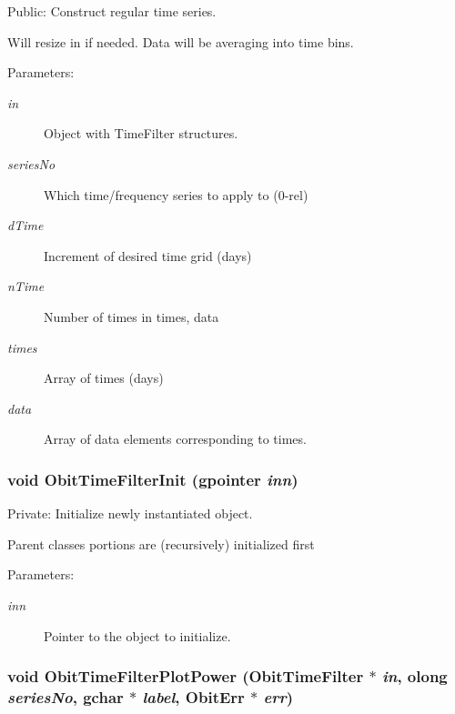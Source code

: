 Public: Construct regular time series. 

Will resize in if needed. Data will be averaging into time bins. \begin{Desc}
\item[Parameters:]
\begin{description}
\item[{\em in}]Object with Time\-Filter structures. \item[{\em series\-No}]Which time/frequency series to apply to (0-rel) \item[{\em d\-Time}]Increment of desired time grid (days) \item[{\em n\-Time}]Number of times in times, data \item[{\em times}]Array of times (days) \item[{\em data}]Array of data elements corresponding to times. \end{description}
\end{Desc}
\subsubsection{\setlength{\rightskip}{0pt plus 5cm}void Obit\-Time\-Filter\-Init (gpointer {\em inn})}\label{ObitTimeFilter_8c_a3}


Private: Initialize newly instantiated object. 

Parent classes portions are (recursively) initialized first \begin{Desc}
\item[Parameters:]
\begin{description}
\item[{\em inn}]Pointer to the object to initialize. \end{description}
\end{Desc}
\subsubsection{\setlength{\rightskip}{0pt plus 5cm}void Obit\-Time\-Filter\-Plot\-Power ({\bf Obit\-Time\-Filter} $\ast$ {\em in}, {\bf olong} {\em series\-No}, gchar $\ast$ {\em label}, {\bf Obit\-Err} $\ast$ {\em err})}\label{ObitTimeFilter_8c_a16}



